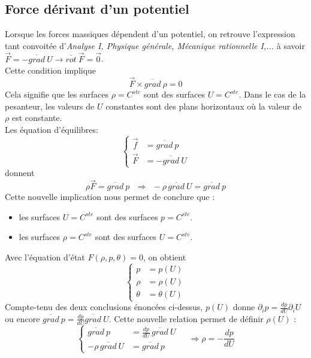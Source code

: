 	
	
\subsection{Force dérivant d'un potentiel}
Lorsque les forces massiques dépendent d'un potentiel, on retrouve l'expression tant
convoitée d'\textit{Analyse I, Physique générale, Mécanique rationnelle I,...} à 
savoir $\vec{F} = -\overline{grad}\ U \rightarrow \overline{rot}\ \vec{F} = \vec 0$.\\
Cette condition implique 
\begin{equation}
	\vec{F}\times \overline{grad}\ \rho = 0
\end{equation}
Cela signifie que les surfaces $\rho = C^{ste}$ sont des surfaces $U = C^{ste}$.
Dans le cas de la pesanteur, les valeurs de $U$ constantes sont des plans horizontaux
où la valeur de $\rho$ est constante.\\
	
Les équation d'équilibres:
\begin{equation}
	\left\{\begin{array}{ll}
	\vec{f} &= \overline{grad}\ p\\
	\vec{F} &= -\overline{grad}\ U
	\end{array}\right.
\end{equation}
donnent
\begin{equation}
	\rho\vec{F} = \overline{grad}\ p\ \ \ \Rightarrow\ \ -\rho\,\overline{grad}\ U =
	\overline{grad}\ p
\end{equation}
Cette nouvelle implication nous permet de conclure que :
\begin{itemize}
	\item les surfaces $U = C^{ste}$ sont des surfaces $p = C^{ste}$.
	\item les surfaces $\rho = C^{ste}$ sont des surfaces $U = C^{ste}$.
\end{itemize}
Avec l'équation d'état $F(\rho,p,\theta) = 0$, on obtient 
\begin{equation}	
	\left\{\begin{array}{ll}
	p &= p(U)\\
	\rho &= \rho(U)\\
	\theta &= \theta(U)
	\end{array}\right.
\end{equation}
Compte-tenu des deux conclusions énoncées ci-dessus, $p(U)$ 
donne $\partial_i p = \frac{dp}{dU}\partial_i U$ ou encore $\overline{grad}\ p = 
\frac{dp}{dU}\overline{grad}\ U$. Cette nouvelle relation permet de définir $\rho(
U)$ :
\begin{equation}
	\left\{\begin{array}{ll}
	\overline{grad}\ p &= \frac{dp}{dU}\,\overline{grad}\ U\\
	-\rho\,\overline{grad}\ U &= 	\overline{grad}\ p
	\end{array}\right.\ \ \ \ \ \Rightarrow \rho = -\dfrac{dp}{dU}
\end{equation}


